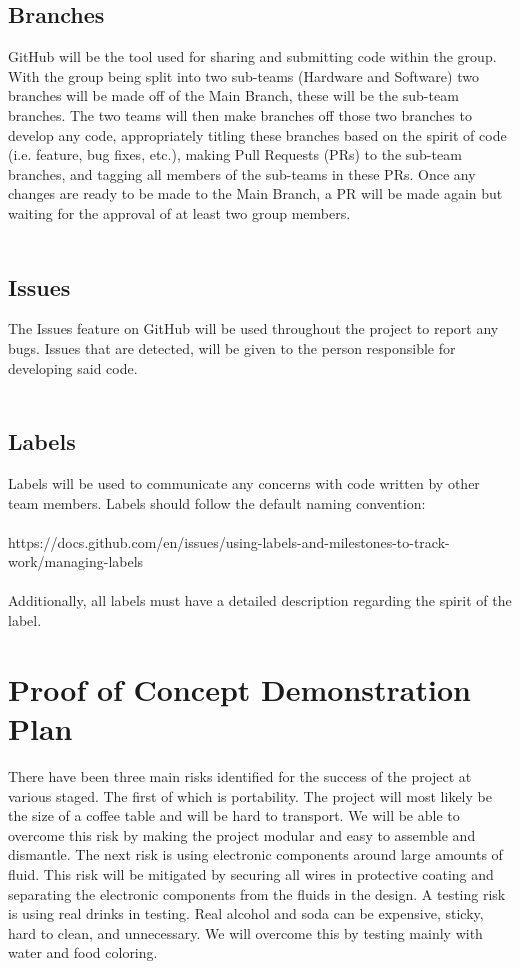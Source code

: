 \documentclass{article}
\begin{document}
\begin{itemize}
\subsection{Branches}
GitHub will be the tool used for sharing and submitting code within the group. With the group being split into two sub-teams (Hardware and Software) two branches will be made off of the Main Branch, these will be the sub-team branches. The two teams will then make branches off those two branches to develop any code, appropriately titling these branches based on the spirit of code (i.e. feature, bug fixes, etc.), making Pull Requests (PRs) to the sub-team branches, and tagging all members of the sub-teams in these PRs. Once any changes are ready to be made to the Main Branch, a PR will be made again but waiting for the approval of at least two group members. \\\\


\subsection{Issues}
The Issues feature on GitHub will be used throughout the project to report any bugs. Issues that are detected, will be given to the person responsible for developing said code. \\\\

\subsection{Labels}
Labels will be used to communicate any concerns with code written by other team members. Labels should follow the default naming convention: \\\\ https://docs.github.com/en/issues/using-labels-and-milestones-to-track-work/managing-labels\\\\
Additionally, all labels must have a detailed description regarding the spirit of the label.
\end{itemize}

\section{Proof of Concept Demonstration Plan}

There have been three main risks identified for the success of the project at various staged. The first of which is portability. The project will most likely be the size of a coffee table and will be hard to transport. We will be able to overcome this risk by making the project modular and easy to assemble and dismantle. The next risk is using electronic components around large amounts of fluid. This risk will be mitigated by securing all wires in protective coating and separating the electronic components from the fluids in the design. A testing risk is using real drinks in testing. Real alcohol and soda can be expensive, sticky, hard to clean, and unnecessary. We will overcome this by testing mainly with water and food coloring.
\end{document}
